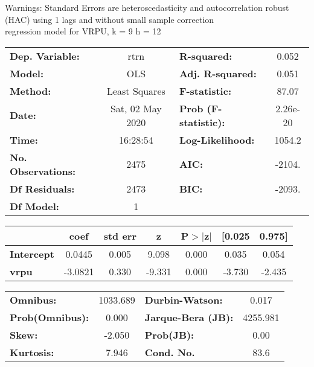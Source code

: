 Warnings: \newline
 [1] Standard Errors are heteroscedasticity and autocorrelation robust (HAC) using 1 lags and without small sample correction\\ 

regression model for VRPU, k = 9 h = 12\begin{center}
\begin{tabular}{lclc}
\toprule
\textbf{Dep. Variable:}    &       rtrn       & \textbf{  R-squared:         } &     0.052   \\
\textbf{Model:}            &       OLS        & \textbf{  Adj. R-squared:    } &     0.051   \\
\textbf{Method:}           &  Least Squares   & \textbf{  F-statistic:       } &     87.07   \\
\textbf{Date:}             & Sat, 02 May 2020 & \textbf{  Prob (F-statistic):} &  2.26e-20   \\
\textbf{Time:}             &     16:28:54     & \textbf{  Log-Likelihood:    } &    1054.2   \\
\textbf{No. Observations:} &        2475      & \textbf{  AIC:               } &    -2104.   \\
\textbf{Df Residuals:}     &        2473      & \textbf{  BIC:               } &    -2093.   \\
\textbf{Df Model:}         &           1      & \textbf{                     } &             \\
\bottomrule
\end{tabular}
\begin{tabular}{lcccccc}
                   & \textbf{coef} & \textbf{std err} & \textbf{z} & \textbf{P$> |$z$|$} & \textbf{[0.025} & \textbf{0.975]}  \\
\midrule
\textbf{Intercept} &       0.0445  &        0.005     &     9.098  &         0.000        &        0.035    &        0.054     \\
\textbf{vrpu}      &      -3.0821  &        0.330     &    -9.331  &         0.000        &       -3.730    &       -2.435     \\
\bottomrule
\end{tabular}
\begin{tabular}{lclc}
\textbf{Omnibus:}       & 1033.689 & \textbf{  Durbin-Watson:     } &    0.017  \\
\textbf{Prob(Omnibus):} &   0.000  & \textbf{  Jarque-Bera (JB):  } & 4255.981  \\
\textbf{Skew:}          &  -2.050  & \textbf{  Prob(JB):          } &     0.00  \\
\textbf{Kurtosis:}      &   7.946  & \textbf{  Cond. No.          } &     83.6  \\
\bottomrule
\end{tabular}
\end{center}

